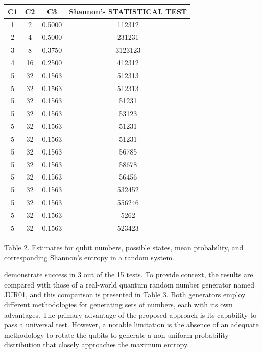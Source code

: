 \documentclass[12pt]{article}
\begin{document}
	   			\begin{center}
	   				\begin{tabular}{ |c|c|c|c| } 
	   					\hline
	   					C1  & C2  & C3 & Shannon’s STATISTICAL TEST\\
	   					\hline
	   					1 & 2 & 0.5000 & 112312 \\ 
	   					2 & 4 & 0.5000 & 231231 \\ 
	   					3 & 8 & 0.3750 & 3123123 \\ 
	   					4 & 16 & 0.2500 & 412312 \\ 
	   					5 & 32 & 0.1563 & 512313 \\ 
	   					5 & 32 & 0.1563 & 512313 \\ 
	   					5 & 32 & 0.1563 & 51231 \\ 			
	   					5 & 32 & 0.1563 & 53123 \\ 
	   					5 & 32 & 0.1563 & 51231 \\ 
	   					5 & 32 & 0.1563 & 51231 \\ 
	   					5 & 32 & 0.1563 & 56785 \\ 			
	   					5 & 32 & 0.1563 & 58678 \\ 
	   					5 & 32 & 0.1563 & 56456 \\ 
	   					5 & 32 & 0.1563 & 532452 \\ 			
	   					5 & 32 & 0.1563 & 556246 \\ 
	   					5 & 32 & 0.1563 & 5262 \\ 
	   					5 & 32 & 0.1563 & 523423 \\ 
	   					\hline
	   				\end{tabular}
	   			\end{center}
	   			{Table 2. Estimates for qubit numbers, possible states, mean probability, and corresponding Shannon’s entropy in a random
	   				system.\\\par
	   				
	   			demonstrate success in 3 out of the 15 tests. To provide context, the results are compared with those of a real-world quantum
	   			random number generator named JUR01, and this comparison is presented in Table 3. Both generators employ different
	   			methodologies for generating sets of numbers, each with its own advantages. The primary advantage of the proposed approach
	   			is its capability to pass a universal test. However, a notable limitation is the absence of an adequate methodology to rotate the
	   			qubits to generate a non-uniform probability distribution that closely approaches the maximum entropy.}\\\par
	   			
\end{document}
